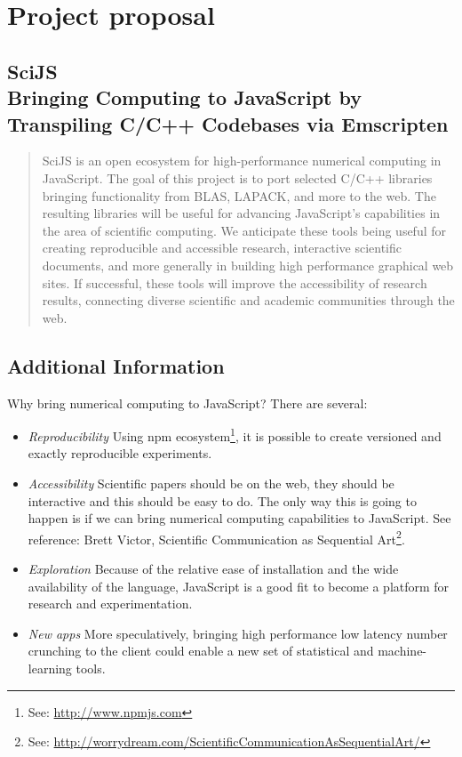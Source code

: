 \documentclass{scrartcl}
\begin{document}
\section{Project proposal}

\subsection*{\centering SciJS \\ Bringing Computing to JavaScript by Transpiling C/C++ Codebases via Emscripten}

\begin{abstract}
SciJS is an open ecosystem for high-performance numerical computing  in JavaScript. The goal of this project is to port selected C/C++ libraries bringing functionality from BLAS\cite{Blackford2002}, LAPACK\cite{Angerson1990}, and more to the web. The resulting libraries will be useful for advancing JavaScript's capabilities in the area of scientific computing. We anticipate these tools being useful for creating reproducible and accessible research, interactive scientific documents, and more generally in building high performance graphical web sites. If successful, these tools will improve the accessibility of research results, connecting diverse scientific and academic communities through the web.
\end{abstract}

\subsection*{Additional Information}

Why bring numerical computing to JavaScript? There are  several:

\begin{itemize}
\item \emph{Reproducibility} Using npm ecosystem\footnote{See: \url{http://www.npmjs.com}}, it is possible to create versioned and exactly reproducible experiments.
\item \emph{Accessibility} Scientific papers should be on the web, they should be interactive and this should be easy to do. The only way this is going to happen is if we can bring numerical computing capabilities to JavaScript. See reference: Brett Victor, Scientific Communication as Sequential Art\footnote{See: \url{http://worrydream.com/ScientificCommunicationAsSequentialArt/}}.
\item \emph{Exploration} Because of the relative ease of installation and the wide availability of the language, JavaScript is a good fit to become a platform for research and experimentation. 
\item \emph{New apps} More speculatively, bringing high performance low latency number crunching to the client could enable a new set of statistical and machine-learning tools.
\end{itemize}
\end{document}
